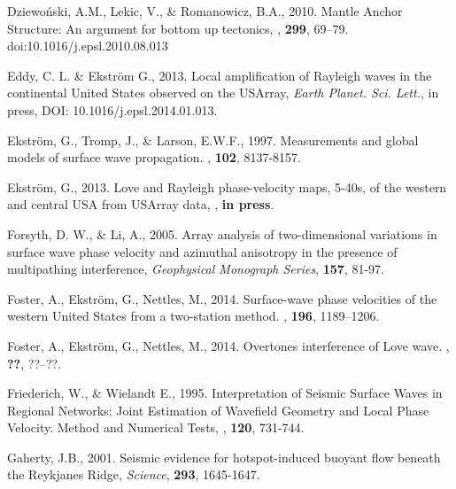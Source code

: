 \documentclass[referee]{gji}
\begin{document}
{{\begin{thebibliography}{}
	   Dziewo\'{n}ski, A.M., Lekic, V., \& Romanowicz, B.A., 2010. Mantle Anchor Structure: An argument for bottom up tectonics, \textit{\epsl}, \textbf{299}, 69–79. doi:10.1016/j.epsl.2010.08.013

	   Eddy, C. L. \& Ekstr\"{o}m G., 2013. Local ampliﬁcation of Rayleigh waves in the continental United States observed on the USArray, \textit{Earth Planet. Sci. Lett.}, in press, DOI: 10.1016/j.epsl.2014.01.013.

	   Ekstr\"{o}m, G., Tromp, J., \& Larson, E.W.F., 1997. Measurements and global models of surface wave propagation. \textit{\jgr}, \textbf{102}, 8137-8157. 

	   Ekstr\"{o}m, G., 2013. Love and Rayleigh phase-velocity maps, 5-40s, of the western and central USA from USArray data, \textit{\epsl}, \textbf{in press}.

	   Forsyth, D. W., \& Li, A., 2005. Array analysis of two-dimensional variations in surface wave phase velocity and azimuthal anisotropy in the presence of multipathing interference, \textit{Geophysical Monograph Series}, \textbf{157}, 81-97.

	   Foster, A., Ekstr\"{o}m, G., Nettles, M., 2014. Surface-wave phase velocities of the western United States from a two-station method. \textit{\gji}, \textbf{196}, 1189–1206.

	   Foster, A., Ekstr\"{o}m, G., Nettles, M., 2014. Overtones interference of Love wave. \textit{}, \textbf{??}, ??–??.

   Friederich, W., \& Wielandt E., 1995. Interpretation of Seismic Surface Waves in Regional Networks: Joint Estimation of Wavefield Geometry and Local Phase Velocity. Method and Numerical Tests, \textit{\gjras}, \textbf{120}, 731-744.

	   Gaherty, J.B., 2001. Seismic evidence for hotspot-induced buoyant flow beneath the Reykjanes Ridge, \textit{Science}, \textbf{293}, 1645-1647.


\end{thebibliography}}}
\end{document}
